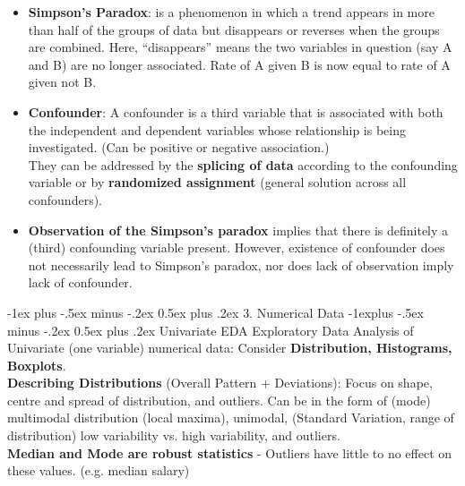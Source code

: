 \documentclass[10pt, landscape]{article}
\makeatletter
\renewcommand{\section}{\@startsection{section}{1}{0mm}%
                                {-1ex plus -.5ex minus -.2ex}%
                                {0.5ex plus .2ex}%
                                {\normalfont\large\bfseries}}
\renewcommand{\subsection}{\@startsection{subsection}{2}{0mm}%
                                {-1explus -.5ex minus -.2ex}%
                                {0.5ex plus .2ex}%
                                {\normalfont\normalsize\bfseries}}
\makeatother
\begin{document}
\begin{multicols*}{4}
\begin{itemize}
	\item \textbf{Simpson's Paradox}: is a phenomenon in which a trend appears in more than half of the groups of data but disappears or reverses when the groups are combined. Here, “disappears” means the two variables in question (say A and B) are no longer associated. Rate of A given B is now equal to rate of A given not B. 
	\item \textbf{Confounder}: A confounder is a third variable that is associated with both the independent and
dependent variables whose relationship is being investigated. (Can be positive or negative association.) \\
They can be addressed by the \textbf{splicing of data} according to the confounding variable or by \textbf{randomized assignment} (general solution across all confounders). 
	\item \textbf{Observation of the Simpson's paradox} implies that there is definitely a (third) confounding variable present. However, existence of confounder does not necessarily lead to Simpson's paradox, nor does lack of observation imply lack of confounder.
\end{itemize}

\section{3. Numerical Data}
\subsection{Univariate EDA}
	Exploratory Data Analysis of Univariate (one variable) numerical data: Consider \textbf{Distribution, Histograms, Boxplots}. \\
	\textbf{Describing Distributions} (Overall Pattern + Deviations): Focus on shape, centre and spread of distribution, and outliers. Can be in the form of (mode) multimodal distribution (local maxima), unimodal, (Standard Variation, range of distribution) low variability vs. high variability, and outliers. \\
	\textbf{Median and Mode are robust statistics} - Outliers have little to no effect on these values. (e.g. median salary) 

\end{multicols*}
\end{document}
